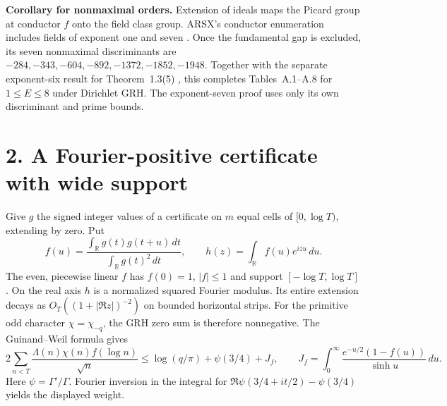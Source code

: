 \documentclass[11pt,letterpaper]{article}
\newcommand{\sect}[1]{\section*{#1}}
\begin{document}
\textbf{Corollary for nonmaximal orders.}
Extension of ideals maps the Picard group at conductor \(f\) onto the field
class group. ARSX's conductor enumeration includes fields of exponent one
and seven \cite[\S\S5--6]{ARSX}. Once the fundamental gap is excluded, its
seven nonmaximal discriminants are
\(-284,-343,-604,-892,-1372,-1852,-1948\).
Together with the separate exponent-six result for Theorem~1.3(5) \cite{six},
this completes Tables~A.1--A.8 for \(1\le E\le8\) under Dirichlet GRH.
The exponent-seven proof uses only its own discriminant and prime bounds.

\newpage
\sect{2. A Fourier-positive certificate with wide support}
Give \(g\) the signed integer values of a certificate on \(m\) equal cells
of \([0,\log T)\), extending by zero. Put
\[
 f(u)=\frac{\int_{\mathbb R} g(t)g(t+u)\,dt}{\int_{\mathbb R}g(t)^2\,dt},
 \qquad h(z)=\int_{\mathbb R}f(u)e^{izu}\,du.
\]
The even, piecewise linear \(f\) has \(f(0)=1\), \(|f|\le1\) and support
\([-\log T,\log T]\). On the real axis \(h\) is a normalized squared
Fourier modulus. Its entire extension decays as
\(O_T((1+|\Re z|)^{-2})\) on bounded horizontal strips. For the primitive
odd character \(\chi=\chi_{-q}\), the GRH zero sum is therefore nonnegative.
The Guinand--Weil formula \cite[Lemma 9]{CMQR} gives
\begin{equation}
 2\sum_{n<T}\frac{\Lambda(n)\chi(n)f(\log n)}{\sqrt n}
 \le \log(q/\pi)+\psi(3/4)+J_f,\qquad
 J_f=\int_0^\infty\frac{e^{-u/2}(1-f(u))}{\sinh u}\,du .
 \label{eq:gw}
\end{equation}
Here \(\psi=\Gamma'/\Gamma\). Fourier inversion in the integral for
\(\Re\psi(3/4+it/2)-\psi(3/4)\) yields the displayed weight.
\end{document}
